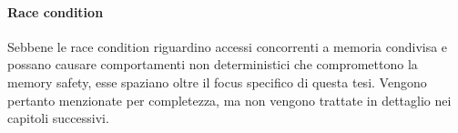 \paragraph{Race condition}
\label{sec:race_conditions}

Sebbene le race condition riguardino accessi concorrenti a memoria condivisa e possano
causare comportamenti non deterministici che compromettono la memory safety,
esse spaziano oltre il focus specifico di questa tesi. Vengono pertanto menzionate
per completezza, ma non vengono trattate in dettaglio nei capitoli successivi.